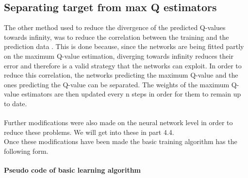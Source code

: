 \subsection{Separating target from max Q estimators}
The other method used to reduce the divergence of the predicted Q-values towards infinity, was to reduce the correlation between the training and the prediction data \cite{Mnih2015}. This is done because, since the networks are being fitted partly on the maximum Q-value estimation, diverging towards infinity reduces their error and therefore is a valid strategy that the networks can exploit. In order to reduce this correlation, the networks predicting the maximum Q-value and the ones predicting the Q-value can be separated. The weights of the maximum Q-value estimators are then updated every n steps in order for them to remain up to date.\\
\mbox{}\\
Further modifications were also made on the neural network level in order to reduce these problems. We will get into these in part 4.4.\\
Once these modifications have been made the basic training algorithm has the following form.
\paragraph{Pseudo code of basic learning algorithm}

